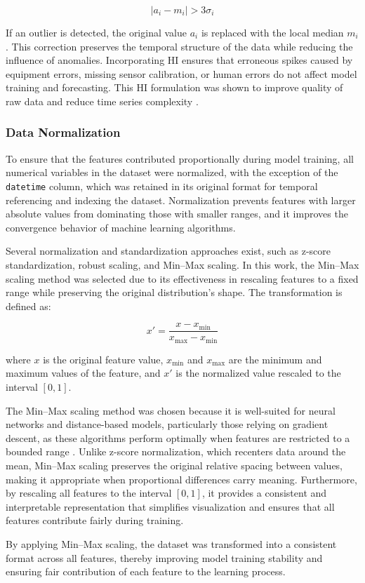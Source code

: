 \[
|a_i - m_i| > 3\sigma_i
\tag{4}
\]

If an outlier is detected, the original value \(a_i\) is replaced with the local median \(m_i\). This correction preserves the temporal structure of the data while reducing the influence of anomalies. Incorporating HI ensures that erroneous spikes caused by equipment errors, missing sensor calibration, or human errors do not affect model training and forecasting. This HI formulation was shown to improve quality of raw data and reduce time series complexity \cite{hiceemdanQteg}.

\subsubsection{Data Normalization}

To ensure that the features contributed proportionally during model training, all numerical variables in the dataset were normalized, with the exception of the \texttt{datetime} column, which was retained in its original format for temporal referencing and indexing the dataset. Normalization prevents features with larger absolute values from dominating those with smaller ranges, and it improves the convergence behavior of machine learning algorithms.

Several normalization and standardization approaches exist, such as z-score standardization, robust scaling, and Min–Max scaling. In this work, the Min–Max scaling method was selected due to its effectiveness in rescaling features to a fixed range while preserving the original distribution’s shape. The transformation is defined as:

\[
x' = \frac{x - x_{\min}}{x_{\max} - x_{\min}}
\tag{5}
\]

where \(x\) is the original feature value, \(x_{\min}\) and \(x_{\max}\) are the minimum and maximum values of the feature, and \(x'\) is the normalized value rescaled to the interval \([0,1]\).

The Min–Max scaling method was chosen because it is well-suited for neural networks and distance-based models, particularly those relying on gradient descent, as these algorithms perform optimally when features are restricted to a bounded range \cite{featureScaling}. Unlike z-score normalization, which recenters data around the mean, Min–Max scaling preserves the original relative spacing between values, making it appropriate when proportional differences carry meaning. Furthermore, by rescaling all features to the interval \([0,1]\), it provides a consistent and interpretable representation that simplifies visualization and ensures that all features contribute fairly during training.

By applying Min–Max scaling, the dataset was transformed into a consistent format across all features, thereby improving model training stability and ensuring fair contribution of each feature to the learning process.
